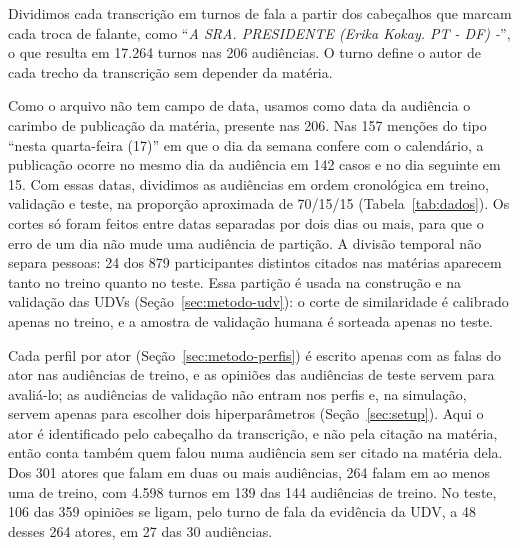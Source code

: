 Dividimos cada transcrição em turnos de fala a partir dos cabeçalhos que marcam cada troca de
falante, como ``\textit{A SRA. PRESIDENTE (Erika Kokay. PT - DF) -}'', o que resulta em 17.264 turnos
nas 206 audiências. O turno define o autor de
cada trecho da transcrição sem depender da matéria.

Como o arquivo não tem campo de data, usamos como data da audiência o carimbo de publicação da
matéria, presente nas 206. Nas 157
menções do tipo ``nesta quarta-feira (17)'' em que o dia da semana confere com o calendário, a
publicação ocorre no mesmo dia da audiência em 142 casos e no dia seguinte em 15. Com essas datas,
dividimos as audiências em ordem cronológica em treino, validação e teste, na proporção aproximada de
70/15/15 (Tabela~\ref{tab:dados}). Os cortes só foram feitos entre datas separadas por dois dias ou
mais, para que o erro de um dia não mude uma audiência de partição. A divisão temporal não separa
pessoas: 24 dos 879 participantes distintos citados nas matérias aparecem tanto no treino quanto no
teste. Essa partição é usada na construção e na validação das UDVs (Seção~\ref{sec:metodo-udv}): o corte
de similaridade é calibrado apenas no treino, e a amostra de validação humana é sorteada apenas no
teste.

Cada perfil por ator (Seção~\ref{sec:metodo-perfis}) é escrito apenas com as falas do ator nas
audiências de treino, e as opiniões das audiências de teste servem para avaliá-lo; as audiências de
validação não entram nos perfis e, na simulação, servem apenas para escolher dois hiperparâmetros
(Seção~\ref{sec:setup}). Aqui o ator é identificado pelo cabeçalho da
transcrição, e não pela citação na matéria, então conta também quem falou numa audiência sem ser
citado na matéria dela. Dos 301 atores que falam em duas ou mais audiências, 264 falam em ao menos uma
de treino, com 4.598 turnos em 139 das 144 audiências de treino. No teste, 106 das 359 opiniões se
ligam, pelo turno de fala da evidência da UDV, a 48 desses 264 atores, em 27 das 30 audiências.



